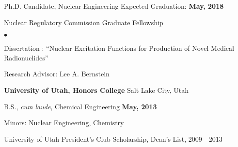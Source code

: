 \documentclass[margin,centered]{res}
\newenvironment{list1}{
  \begin{list}{\ding{113}}{%
      \setlength{\itemsep}{0in}
      \setlength{\parsep}{0in} \setlength{\parskip}{0in}
      \setlength{\topsep}{0in} \setlength{\partopsep}{0in} 
      \setlength{\leftmargin}{0.17in}}}{\end{list}}
\newenvironment{list2}{
  \begin{list}{$\bullet$}{%
      \setlength{\itemsep}{0in}
      \setlength{\parsep}{0in} \setlength{\parskip}{0in}
      \setlength{\topsep}{0in} \setlength{\partopsep}{0in} 
      \setlength{\leftmargin}{0.2in}}}{\end{list}}
\begin{document}
\begin{resume}
\begin{list1}
\item[] Ph.D. Candidate, Nuclear Engineering \hfill { Expected Graduation: \textbf{May, 2018}}
\item[] Nuclear Regulatory Commission Graduate Fellowship 
\begin{list2}
\vspace*{.05in}
\item Dissertation
: \enquote{Nuclear Excitation Functions for Production of Novel Medical Radionuclides}
\item Research Advisor:  Lee A. Bernstein
\end{list2}
\end{list1}



{\bf University of Utah, Honors College}  \hfill{ Salt Lake City, Utah}

\begin{list1}
\item[] B.S., \textit{cum laude}, Chemical Engineering  \hfill{\bf May, 2013}
\item[] Minors: Nuclear Engineering, Chemistry
\item[] University of Utah President's Club Scholarship, Dean's List, 2009 - 2013
\end{list1}





\end{resume}
\end{document}
